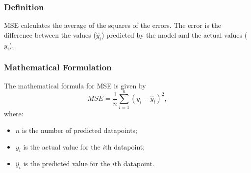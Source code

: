 \subsubsection{Definition}
MSE calculates the average of the squares of the errors. The error is the difference between the values (\(\hat{y}_i\)) predicted by the model and the actual values (\(y_i\)).


\subsubsection{Mathematical Formulation}
The mathematical formula for MSE is given by
\begin{equation}
	MSE = \frac{1}{n} \sum_{i=1}^{n} (y_i - \hat{y}_i)^2,
\end{equation}
where:
\begin{itemize}
	\item \(n\) is the number of predicted datapoints;
	\item \(y_i\) is the actual value for the \(i\)th datapoint;
	\item \(\hat{y}_i\) is the predicted value for the \(i\)th datapoint.
\end{itemize}



